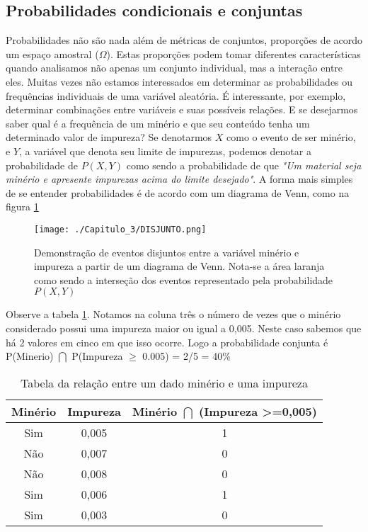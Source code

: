 \subsection{Probabilidades condicionais e conjuntas}

Probabilidades não são nada além de métricas de conjuntos, proporções de acordo um espaço amostral ($\Omega$). Estas proporções podem tomar diferentes características quando analisamos não apenas um conjunto individual, mas a interação entre eles. Muitas vezes não estamos interessados em determinar as probabilidades ou frequências individuais de uma variável aleatória. É interessante, por exemplo, determinar combinações entre variáveis e suas possíveis relações. E se desejarmos saber qual é a frequência de um minério e que seu conteúdo tenha um determinado valor de impureza? Se denotarmos $X$ como o evento de ser minério, e $Y$, a variável que denota seu limite de impurezas, podemos denotar a probabilidade de $P(X,Y)$ como sendo a probabilidade de que \textit{"Um material seja minério e apresente impurezas acima do limite desejado"}. A forma mais simples de se entender probabilidades é de acordo com um diagrama de Venn, como na figura \ref{disjuntos}

\FloatBarrier
\begin{figure}[!htpb]
	\centering
	\texttt{[image: ./Capitulo\_3/DISJUNTO.png]}	
	\caption{Demonstração de eventos disjuntos entre a variável minério e impureza a partir de um diagrama de Venn. Nota-se a área laranja como sendo a interseção dos eventos representado pela probabilidade $P(X,Y)$ }
	\label{disjuntos}
\end{figure}
\FloatBarrier

Observe a tabela \ref{tabela_impureza}. Notamos na coluna três o número de vezes que o minério considerado possui uma impureza maior ou igual a 0,005. Neste caso sabemos que há 2 valores em cinco em que isso ocorre. Logo a probabilidade conjunta é P(Minerio) $\bigcap$ P(Impureza $\geq$  0.005) = 2/5 = 40\%

\FloatBarrier
\begin{table}[!htpb]
	\centering
	\caption{Tabela da relação entre um dado minério e uma impureza}
	\label{tabela_impureza}
	\begin{tabular}{ccc}
		\toprule
		Minério & Impureza & Minério $\bigcap$ (Impureza \textgreater=0,005) \\ \midrule
		Sim     & 0,005    & 1                                                           \\
		Não     & 0,007    & 0                                                           \\
		Não     & 0,008    & 0                                                           \\
		Sim     & 0,006    & 1                                                           \\
		Sim     & 0,003    & 0                                                           \\ \bottomrule
	\end{tabular}
\end{table} 
\FloatBarrier

